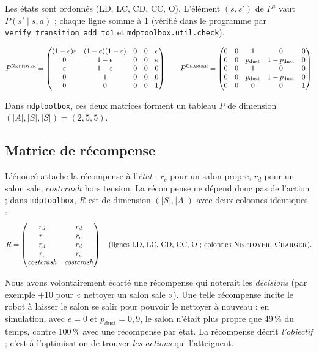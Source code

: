 \documentclass[11pt,a4paper]{article}
\newcommand{\N}{\textsc{Nettoyer}}
\newcommand{\C}{\textsc{Charger}}
\newcommand{\pd}{p_{\text{dust}}}
\begin{document}
Les états sont ordonnés (LD, LC, CD, CC, O). L'élément $(s, s')$ de $P^a$ vaut $P(s' \mid s, a)$ ;
chaque ligne somme à 1 (vérifié dans le programme par \texttt{verify\_transition\_add\_to1} et
\texttt{mdptoolbox.util.check}).

\[
P^{\N} =
\begin{pmatrix}
(1-e)\varepsilon & (1-e)(1-\varepsilon) & 0 & 0 & e \\
0 & 1-e & 0 & 0 & e \\
\varepsilon & 1-\varepsilon & 0 & 0 & 0 \\
0 & 1 & 0 & 0 & 0 \\
0 & 0 & 0 & 0 & 1
\end{pmatrix}
\qquad
P^{\C} =
\begin{pmatrix}
0 & 0 & 1 & 0 & 0 \\
0 & 0 & \pd & 1-\pd & 0 \\
0 & 0 & 1 & 0 & 0 \\
0 & 0 & \pd & 1-\pd & 0 \\
0 & 0 & 0 & 0 & 1
\end{pmatrix}
\]

Dans \texttt{mdptoolbox}, ces deux matrices forment un tableau $P$ de dimension
$(|A|, |S|, |S|) = (2, 5, 5)$.

\subsection{Matrice de récompense}

L'énoncé attache la récompense à l'\emph{état} : $r_c$ pour un salon propre, $r_d$ pour un salon sale,
$\mathit{costcrash}$ hors tension. La récompense ne dépend donc pas de l'action ; dans \texttt{mdptoolbox},
$R$ est de dimension $(|S|, |A|)$ avec deux colonnes identiques :
\[
R =
\begin{pmatrix}
r_d & r_d \\
r_c & r_c \\
r_d & r_d \\
r_c & r_c \\
\mathit{costcrash} & \mathit{costcrash}
\end{pmatrix}
\quad \text{(lignes LD, LC, CD, CC, O ; colonnes \N, \C)}.
\]

Nous avons volontairement écarté une récompense qui noterait les \emph{décisions}
(par exemple $+10$ pour « nettoyer un salon sale »). Une telle récompense incite le robot à laisser le salon se salir pour
pouvoir le nettoyer à nouveau : en simulation, avec $e = 0$ et $\pd = 0{,}9$, le salon n'était plus propre que
49\,\% du temps, contre 100\,\% avec une récompense par état. La récompense décrit \emph{l'objectif} ;
c'est à l'optimisation de trouver \emph{les actions} qui l'atteignent.
\end{document}
